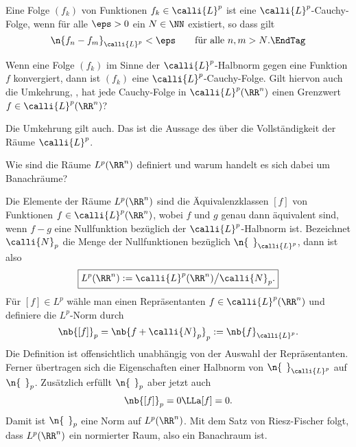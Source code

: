 \begin{antwort}
  Eine Folge $(f_k)$ von Funktionen $f_k \in \calli{L}^p$ ist eine 
  $\calli{L}^p$-Cauchy-Folge, wenn für alle $\eps>0$ ein $N\in \NN$ existiert, 
  so dass gilt 
  \[
  \n{ f_n-f_m }_{\calli{L}^p} < \eps \qquad\text{für alle $n,m>N$}.
  \EndTag
  \] 
\end{antwort}

\begin{frage}\label{11_riesz}
  Wenn eine Folge $(f_k)$ im Sinne der $\calli{L}^p$-Halbnorm 
  gegen eine Funktion $f$ konvergiert, dann ist $(f_k)$ eine 
  $\calli{L}^p$-Cauchy-Folge. Gilt hiervon auch die Umkehrung, 
  {\dasheisst}, hat jede Cauchy-Folge in $\calli{L}^p(\RR^n)$ einen Grenzwert 
  $f\in\calli{L}^p(\RR^n)$?
\end{frage}  

\begin{antwort}
  Die Umkehrung gilt auch. 
  Das ist die Aussage des  über 
  die Vollständigkeit der Räume $\calli{L}^p$. 

  \medskip\noindent
\end{antwort}

\begin{frage}\label{11_Lpraum}
  Wie sind die Räume $L^p(\RR^n)$ definiert und warum handelt es sich dabei um 
  Banachräume?
\end{frage}

\begin{antwort}
  Die Elemente der Räume $L^p(\RR^n)$ sind die Äquivalenzklassen $[f]$ 
  von Funktionen $f\in\calli{L}^p(\RR^n)$, wobei $f$ und $g$ genau dann 
  äquivalent sind, wenn $f-g$ eine Nullfunktion bezüglich der 
  $\calli{L}^p$-Halbnorm ist. Bezeichnet $\calli{N}_p$ die Menge der 
  Nullfunktionen bezüglich $\n{\,\;}_{\calli{L}^p}$, dann ist also
  \[
  \boxed{L^p(\RR^n) := \calli{L}^p(\RR^n) \big/ \calli{N}_p.}
  \] 
  Für $[f]\in L^p$ wähle 
  man einen Repräsentanten $f\in\calli{L}^p(\RR^n)$ und definiere die 
  $L^p$-Norm durch 
  \[
  \nb{ [f] }_p = \nb{ f+\calli{N}_p }_p := 
  \nb{ f }_{\calli{L}^p}.
  \]
  Die Definition ist offensichtlich unabhängig von der 
  Auswahl der Repräsentanten. Ferner übertragen sich die Eigenschaften 
  einer Halbnorm von $\n{\,\;}_{\calli{L}^p}$ auf $\n{\,\;}_p$. Zusätzlich 
  erfüllt $\n{\,\;}_p$ aber jetzt auch 
  \[
  \nb{ [f] }_p = 0 \LLa [f]=0.
  \]
  Damit ist $\n{\,\;}_p$ eine Norm auf $L^p(\RR^n)$. Mit dem Satz von 
  Riesz-Fischer folgt, dass $L^p(\RR^n)$ ein  
  normierter Raum, also ein Banachraum ist.
  \AntEnd   
\end{antwort} 

